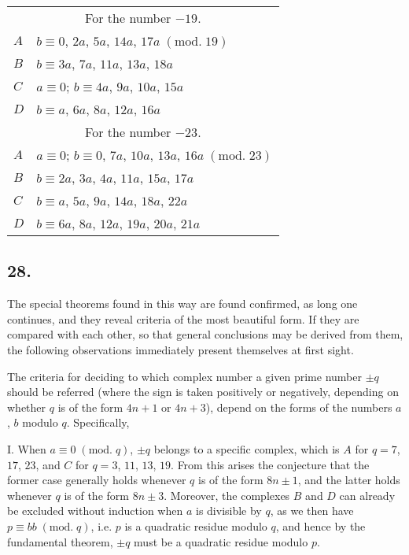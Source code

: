 \documentclass[twoside,12pt]{memoir}
\renewcommand{\pmod}[1]{\;(\textrm{mod.}\;#1)}
\begin{document}
\begin{center}
\begin{tabular}{l|l}
\multicolumn{2}{c}{For the number \(-19\).}\\
\(A\) & \(b \equiv 0\), \(2 a\), \(5 a\), \(14 a\), \(17 a\pmod{19} \)\\
\(B\) & \(b \equiv 3 a\), \(7 a\), \(11 a\), \(13 a\), \(18 a \)\\
\(C\) & \(a \equiv 0\); \(b \equiv 4 a\), \(9 a\), \(10 a\), \(15 a \)\\
\(D\) & \(b \equiv a\), \(6 a\), \(8 a\), \(12 a\), \(16 a\)\\
\multicolumn{2}{c}{For the number \(-23\).}\\
\(A\) & \(a \equiv 0\); \(b \equiv 0\), \(7 a\), \(10 a\), \(13 a\), \(16 a\pmod{23} \)\\
\(B\) & \(b \equiv 2 a\), \(3 a\), \(4 a\), \(11 a\), \(15 a\), \(17 a \)\\
\(C\) & \(b \equiv a\), \(5 a\), \(9 a\), \(14 a\), \(18 a\), \(22 a \)\\
\(D\) & \(b \equiv 6 a\), \(8 a\), \(12 a\), \(19 a\), \(20 a\), \(21 a\)
\end{tabular}
\end{center}

\subsection*{28.}

The special theorems found in this way are found confirmed, as long one continues, and they reveal criteria of the most beautiful form. If they are compared with each other, so that general conclusions may be derived from them, the following observations immediately present themselves at first sight.

The criteria for deciding to which complex number a given prime number \(\pm q\) should be referred (where the sign is taken positively or negatively, depending on whether \(q\) is of the form \(4n+1\) or \(4n+3\)), depend on the forms of the numbers \(a\), \(b\) modulo \(q\). Specifically,

I. When \(a \equiv 0\pmod{q}\), \(\pm q\) belongs to a specific complex, which is \(A\) for \(q=7\), \(17\), \(23\), and \(C\) for \(q=3\), \(11\), \(13\), \(19\). From this arises the conjecture that the former case generally holds whenever \(q\) is of the form \(8n\pm1\), and the latter holds whenever \(q\) is of the form \(8n\pm3\).  Moreover, the complexes \(B\) and \(D\) can already be excluded without induction when \(a\) is divisible by \(q\), as we then have \(p \equiv b b\pmod{q}\), i.e. \(p\) is a quadratic residue modulo \(q\), and hence by the fundamental theorem, \(\pm q\) must be a quadratic residue modulo \(p\).
\end{document}
